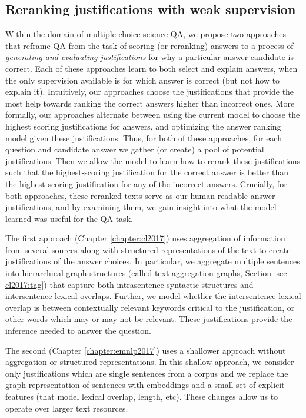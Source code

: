 \subsection{Reranking justifications with weak supervision}
\label{sec:reranking_justifications}

Within the domain of multiple-choice science QA, we propose two approaches that reframe QA from the task of scoring (or reranking) answers to a process of \emph{generating and evaluating justifications} for why a particular answer candidate is correct.  
Each of these approaches learn to both select and explain answers, when the only supervision available is for which answer is correct (but not how to explain it).
Intuitively, our approaches choose the justifications that provide the most help towards ranking the correct answers higher than incorrect ones.  
More formally, our approaches alternate between using the current model to choose the highest scoring justifications for answers, and optimizing the answer ranking model given these justifications. 
Thus, for both of these approaches, for each question and candidate answer we gather (or create) a pool of potential justifications.  Then we allow the model to learn how to rerank these justifications such that the highest-scoring justification for the correct answer is better than the highest-scoring justification for any of the incorrect answers.   
Crucially, for both approaches, these reranked texts serve as our human-readable answer justifications, and by examining them, we gain insight into what the model learned was useful for the QA task. 

The first approach (Chapter \ref{chapter:cl2017}) uses aggregation of information from several sources along with structured representations of the text to create justifications of the answer choices.  
In particular, we aggregate multiple sentences into hierarchical graph structures (called text aggregation graphs, Section \ref{sec-cl2017:tag}) that capture both intrasentence syntactic structures and intersentence lexical overlaps. 
Further, we model whether the intersentence lexical overlap is between contextually relevant keywords critical to the justification, or other words which may or may not be relevant. These justifications provide the inference needed to answer the question.

The second (Chapter \ref{chapter:emnlp2017}) uses a shallower approach without aggregation or structured representations.  In this shallow approach, we consider only justifications which are single sentences from a corpus and we replace the graph representation of sentences with embeddings and a small set of explicit features (that model lexical overlap, length, etc).  These changes allow us to operate over larger text resources.  

